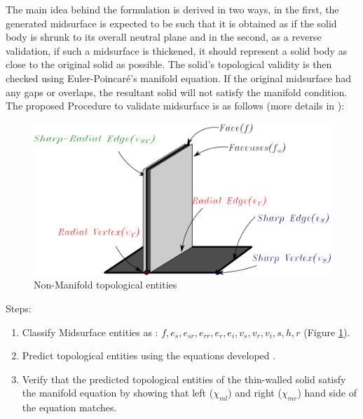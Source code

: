 The main idea behind the formulation is  derived in two ways, in the first, the generated midsurface is expected to be such that it is obtained as if the solid body is shrunk to its overall neutral plane and in the second, as a reverse validation, if such a midsurface is thickened, it should represent a solid body as close to the original solid as possible. The solid's topological validity is then checked using Euler-Poincar\'e's manifold equation. If the original midsurface had any gaps or overlaps, the resultant solid will not satisfy the manifold condition. The proposed Procedure to validate midsurface is as follows (more details in \cite{YogeshCADandA2015}):   %

\begin{figure}[h]
\centering 

\includegraphics[width=0.7\linewidth]{../Common/images/NonManifoldT1.pdf}
\caption{Non-Manifold topological entities}
\label{fig_nonmanifold}
\end{figure}
Steps:
\begin{enumerate}[noitemsep,topsep=2pt,parsep=2pt,partopsep=2pt]
\item Classify Midsurface entities  as : $f, e_s , e_{sr} , e_{rr}, e_r , e_i, v_s , v_r , v_i, s , h , r$ (Figure \ref{fig_nonmanifold}).
\item Predict topological entities using the equations developed \cite{YogeshCADandA2015}.%
\item Verify that the predicted topological entities of the  thin-walled solid satisfy the manifold equation by showing that left ($\chi_{ml}$) and right  ($\chi_{mr}$) hand side of the equation matches. %
\end{enumerate}

